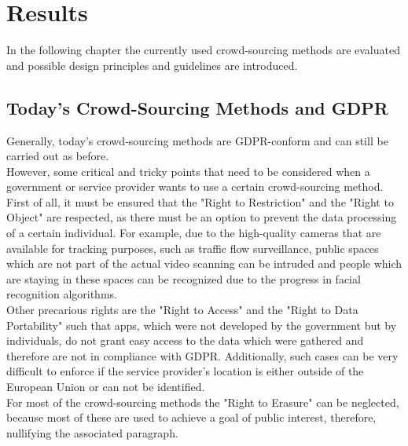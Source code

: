 \documentclass[a4paper,12pt]{report}
\begin{document}
	\chapter{Results} \label{Results}
	In the following chapter the currently used crowd-sourcing methods are evaluated and possible design principles and guidelines are introduced.
	
	\section{Today's Crowd-Sourcing Methods and GDPR} \label{juxtaposition}
	\startsection
		Generally, today's crowd-sourcing methods are GDPR-conform and can still be carried out as before. \\
		However, some critical and tricky points that need to be considered when a government or service provider wants to use a certain crowd-sourcing method. \\
		First of all, it must be ensured that the "Right to Restriction" and the "Right to Object" are respected, as there must be an option to prevent the data processing of a certain individual. For example, due to the high-quality cameras that are available for tracking purposes, such as traffic flow surveillance, public spaces which are not part of the actual video scanning can be intruded and people which are staying in these spaces can be recognized due to the progress in facial recognition algorithms. \\
		Other precarious rights are the "Right to Access" and the "Right to Data Portability" such that apps, which were not developed by the government but by individuals, do not grant easy access to the data which were gathered and therefore are not in compliance with GDPR. Additionally, such cases can be very difficult to enforce if the service provider's location is either outside of the European Union or can not be identified. \\
		For most of the crowd-sourcing methods the "Right to Erasure" can be neglected, because most of these are used to achieve a goal of public interest, therefore, nullifying the associated paragraph.
	\closesection
	
\end{document}
